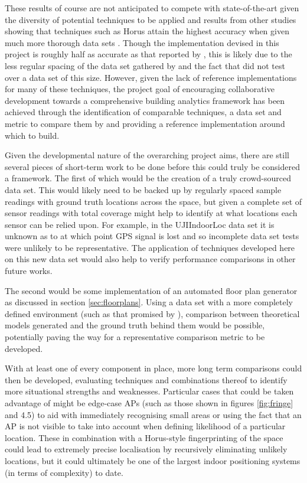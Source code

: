 \documentclass{UoYCSproject}
\begin{document}
        These results of course are not anticipated to compete with state-of-the-art given the diversity of potential techniques to be applied and results from other studies showing that techniques such as Horus attain the highest accuracy when given much more thorough data sets \citep{youssef2005horus, chintalapudi2010indoor}. Though the implementation devised in this project is roughly half as accurate as that reported by \citet{chintalapudi2010indoor}, this is likely due to the less regular spacing of the data set gathered by \citet{torres2014ujiindoorloc} and the fact that \citeauthor{chintalapudi2010indoor} did not test over a data set of this size. However, given the lack of reference implementations for many of these techniques, the project goal of encouraging collaborative development towards a comprehensive building analytics framework has been achieved through the identification of comparable techniques, a data set and metric to compare them by and providing a reference implementation around which to build.
        
        Given the developmental nature of the overarching project aims, there are still several pieces of short-term work to be done before this could truly be considered a framework. The first of which would be the creation of a truly crowd-sourced data set. This would likely need to be backed up by regularly spaced sample readings with ground truth locations across the space, but given a complete set of sensor readings with total coverage might help to identify at what locations each sensor can be relied upon. For example, in the UJIIndoorLoc data set it is unknown as to at which point GPS signal is lost and so incomplete data set tests were unlikely to be representative. The application of techniques developed here on this new data set would also help to verify performance comparisons in other future works.
            
        The second would be some implementation of an automated floor plan generator as discussed in section \ref{sec:floorplans}. Using a data set with a more completely defined environment (such as that promised by \citet{JoaquinEmail}), comparison between theoretical models generated and the ground truth behind them would be possible, potentially paving the way for a representative comparison metric to be developed.
            
        With at least one of every component in place, more long term comparisons could then be developed, evaluating techniques and combinations thereof to identify more situational strengths and weaknesses. Particular cases that could be taken advantage of might be edge-case APs (such as those shown in figures \ref{fig:fringe} and 4.5) to aid with immediately recognising small areas or using the fact that an AP is not visible to take into account when defining likelihood of a particular location. These in combination with a Horus-style fingerprinting of the space could lead to extremely precise localisation by recursively eliminating unlikely locations, but it could ultimately be one of the largest indoor positioning systems (in terms of complexity) to date.
\end{document}
